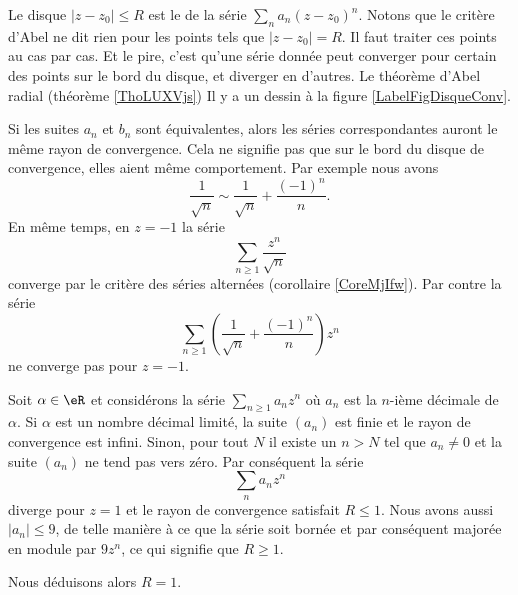 Le disque $| z-z_0 |\leq R$ est le  de la série \( \sum_n a_n(z-z_0)^n\). Notons que le critère d'Abel ne dit rien pour les points tels que $| z-z_0 |=R$. Il faut traiter ces points au cas par cas. Et le pire, c'est qu'une série donnée peut converger pour certain des points sur le bord du disque, et diverger en d'autres. Le théorème d'Abel radial (théorème \ref{ThoLUXVjs})
Il y a un dessin à la figure \ref{LabelFigDisqueConv}.
\newcommand{\CaptionFigDisqueConv}{À l'intérieur du disque de convergence, la convergence est absolue. En dehors, la série diverge. Sur le cercle proprement dit, tout peut arriver.}


Si les suites \( a_n\) et \( b_n\) sont équivalentes, alors les séries correspondantes auront le même rayon de convergence. Cela ne signifie pas que sur le bord du disque de convergence, elles aient même comportement. Par exemple nous avons
\begin{equation}
    \frac{1}{ \sqrt{n} }\sim \frac{1}{ \sqrt{n} }+\frac{ (-1)^n }{ n }.
\end{equation}
En même temps, en \( z=-1\) la série 
\begin{equation}
    \sum_{n\geq 1}\frac{ z^n }{ \sqrt{n} }
\end{equation}
converge par le critère des séries alternées (corollaire \ref{CoreMjIfw}). Par contre la série
\begin{equation}
    \sum_{n\geq 1}\left( \frac{1}{ \sqrt{n} }+\frac{ (-1)^n }{ n } \right)z^n
\end{equation}
ne converge pas pour \( z=-1\).

\begin{example}
    Soit \( \alpha\in \eR\) et considérons la série \( \sum_{n\geq 1}a_nz^n\) où \( a_n\) est la \( n\)-ième décimale de \( \alpha\). Si \( \alpha\) est un nombre décimal limité, la suite \( (a_n)\) est finie et le rayon de convergence est infini. Sinon, pour tout \( N\) il existe un \( n>N\) tel que \( a_n\neq 0\) et la suite \( (a_n)\) ne tend pas vers zéro. Par conséquent la série
    \begin{equation}
        \sum_{n}a_nz^n
    \end{equation}
    diverge pour \( z=1\) et le rayon de convergence satisfait \( R\leq 1\). Nous avons aussi \( | a_n |\leq 9\), de telle manière à ce que la série soit bornée et par conséquent majorée en module par \( 9z^n\), ce qui signifie que \( R\geq 1\). 

    Nous déduisons alors \( R=1\).
\end{example}

